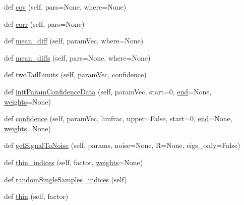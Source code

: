 \begin{DoxyCompactItemize}
\item 
def \mbox{\hyperlink{classgetdist_1_1chains_1_1WeightedSamples_a61a1250aa6f6292f59f2e24e9df364f0}{cov}} (self, pars=None, where=None)
\item 
def \mbox{\hyperlink{classgetdist_1_1chains_1_1WeightedSamples_ad7fc11d463b6ebe773ecd156e7e7bcce}{corr}} (self, pars=None)
\item 
def \mbox{\hyperlink{classgetdist_1_1chains_1_1WeightedSamples_a4a7ffc36e87801cb74f9ec78896c220b}{mean\+\_\+diff}} (self, param\+Vec, where=None)
\item 
def \mbox{\hyperlink{classgetdist_1_1chains_1_1WeightedSamples_a22eba6159f13f1185d7359885a6e927c}{mean\+\_\+diffs}} (self, pars=None, where=None)
\item 
def \mbox{\hyperlink{classgetdist_1_1chains_1_1WeightedSamples_a85a7b24ea47b3ff8a4f1595e026abae4}{two\+Tail\+Limits}} (self, param\+Vec, \mbox{\hyperlink{classgetdist_1_1chains_1_1WeightedSamples_aafea7daa99724b91392e41c4157a29a0}{confidence}})
\item 
def \mbox{\hyperlink{classgetdist_1_1chains_1_1WeightedSamples_af09edaafcc644533d7c24107f2daec81}{init\+Param\+Confidence\+Data}} (self, param\+Vec, start=0, \mbox{\hyperlink{plotTT_8m_afb358f48b1646c750fb9da6c6585be2b}{end}}=None, \mbox{\hyperlink{classgetdist_1_1chains_1_1WeightedSamples_a9465be88e1aedfe56830e8c730950d59}{weights}}=None)
\item 
def \mbox{\hyperlink{classgetdist_1_1chains_1_1WeightedSamples_aafea7daa99724b91392e41c4157a29a0}{confidence}} (self, param\+Vec, limfrac, upper=False, start=0, \mbox{\hyperlink{plotTT_8m_afb358f48b1646c750fb9da6c6585be2b}{end}}=None, \mbox{\hyperlink{classgetdist_1_1chains_1_1WeightedSamples_a9465be88e1aedfe56830e8c730950d59}{weights}}=None)
\item 
def \mbox{\hyperlink{classgetdist_1_1chains_1_1WeightedSamples_a0e52eea3657af98ee560e575a31a6cf0}{get\+Signal\+To\+Noise}} (self, params, noise=None, R=None, eigs\+\_\+only=False)
\item 
def \mbox{\hyperlink{classgetdist_1_1chains_1_1WeightedSamples_a41dc494a820fc43ecbf7a58dd32e4602}{thin\+\_\+indices}} (self, factor, \mbox{\hyperlink{classgetdist_1_1chains_1_1WeightedSamples_a9465be88e1aedfe56830e8c730950d59}{weights}}=None)
\item 
def \mbox{\hyperlink{classgetdist_1_1chains_1_1WeightedSamples_a37b625d6d15044bdbb4d59b3ed6680dc}{random\+Single\+Samples\+\_\+indices}} (self)
\item 
def \mbox{\hyperlink{classgetdist_1_1chains_1_1WeightedSamples_a99cf3cd470c17389b594acbe0c02f174}{thin}} (self, factor)

\end{DoxyCompactItemize}
